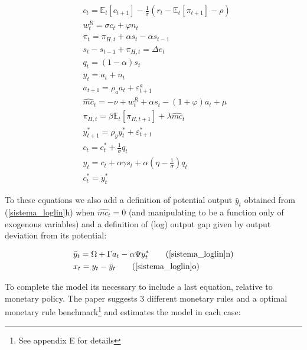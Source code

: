 \documentclass{article}
\newcommand{\Et}{\mathbb{E}_t}
\begin{document}
\begin{subequations}
\label{sistema_loglin}
    \begin{align}
        &c_t = \Et[c_{t+1}] - \frac{1}{\sigma} (r_t - \Et[\pi_{t+1}] - \rho)\\
        & w_t^R = \sigma c_t + \varphi n_t \\
        &\pi_t = \pi_{H,t} + \alpha s_t - \alpha s_{t-1}\\
        &s_{t} - s_{t-1} + \pi_{H,t} = \Delta e_t \\
        &q_t = (1-\alpha) s_t\\
        &y_t = a_t +  n_t\\
        &a_{t+1} = \rho_a a_t + \varepsilon^a_{t+1}\\
        &\hat{mc}_{t} = -\nu + w_t^R + \alpha s_t - (1+ \varphi )a_t + \mu\\
        & \pi_{H,t} = \beta \Et[\pi_{H,t+1}] + \lambda \hat{mc}_t\\
        &y^*_{t+1} = \rho_y y^*_t + \varepsilon^*_{t+1}\\
        &c_t = c_t^* + \frac{1}{\sigma} q_t\\
        &y_t = c_t + \alpha \gamma s_t + \alpha \left( \eta - \frac{1}{\sigma} \right) q_t\\
        &c_t^* = y_t^*
    \end{align}
\end{subequations}

To these equations we also add a definition of potential output $\bar y_t$ obtained from (\ref{sistema_loglin}h) when $\hat{mc_t} = 0$ (and manipulating to be a function only of exogenous variables) and a definition of (log) output gap given by output deviation from its potential:

\begin{subequations}
    \begin{align}
        &\bar y_t = \Omega + \Gamma a_t - \alpha \Psi y_t^* \tag{\ref{sistema_loglin}n}\\
        &x_t = y_t - \bar y_t \tag{\ref{sistema_loglin}o}
    \end{align}
\end{subequations}

To complete the model its necessary to include a last equation, relative to monetary policy. The paper suggests 3 different monetary rules and a optimal monetary rule benchmark\footnote{See appendix E for details} and estimates the model in each case:
\end{document}
